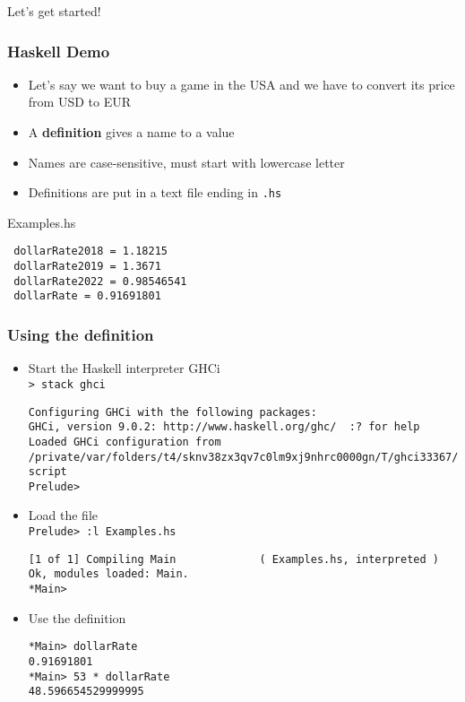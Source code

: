 \documentclass{beamer}
\subtitle{Starting Haskell}
\begin{document}
\begin{frame}
  \titlepage
\end{frame}

\begin{frame}
  \begin{Huge}
    \begin{center}
      Let's get started!
    \end{center}
  \end{Huge}
\end{frame}


\begin{frame}[fragile]
  \frametitle{Haskell Demo}
  \begin{itemize}
  \item  Let's say we want to buy a game in the USA and we have to
    convert its price from USD to EUR
  \item  A \textbf{definition} gives a name to a value
  \item Names are  case-sensitive, must start with lowercase letter
  \item Definitions are  put in a text file ending in \texttt{.hs}
  \end{itemize}
  \begin{block}{Examples.hs}
\begin{verbatim}
 dollarRate2018 = 1.18215  
 dollarRate2019 = 1.3671
 dollarRate2022 = 0.98546541
 dollarRate = 0.91691801
\end{verbatim}
  \end{block}
\end{frame}
\begin{frame}[fragile]
  \frametitle{Using the definition}
  \begin{itemize}
  \item Start the Haskell interpreter  GHCi\\
    \texttt{> stack ghci}
\begin{verbatim}
Configuring GHCi with the following packages: 
GHCi, version 9.0.2: http://www.haskell.org/ghc/  :? for help
Loaded GHCi configuration from /private/var/folders/t4/sknv38zx3qv7c0lm9xj9nhrc0000gn/T/ghci33367/ghci-script
Prelude> 
\end{verbatim}
  \item Load the file\\
    \texttt{Prelude> :l Examples.hs}
\begin{verbatim}
[1 of 1] Compiling Main             ( Examples.hs, interpreted )
Ok, modules loaded: Main.
*Main> 
\end{verbatim}
  \item Use the definition
\begin{verbatim}
*Main> dollarRate
0.91691801
*Main> 53 * dollarRate
48.596654529999995
\end{verbatim}
  \end{itemize}
\end{frame}
\end{document}
